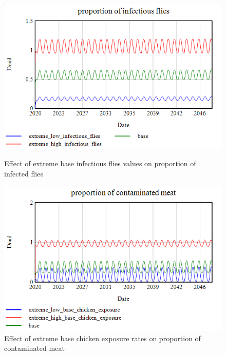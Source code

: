 \begin{figure}[h!]
    \centering
    \begin{minipage}{0.45\textwidth}
        \centering
        \includegraphics[width=\textwidth]{images/extremes/base_infectious_flies_proportion_flies.png} 
        \caption{Effect of extreme base infectious flies values on proportion of infected flies}
        \label{fig:fly_meat}
    \end{minipage}
    \begin{minipage}{0.45\textwidth}
        \centering
        \includegraphics[width=\textwidth]{images/extremes/Base_chicken_exposure_contaminated_meat.png} 
        \caption{Effect of extreme base chicken exposure rates on proportion of contaminated meat}
        \label{fig:exposure_meat}
    \end{minipage}
\end{figure}

